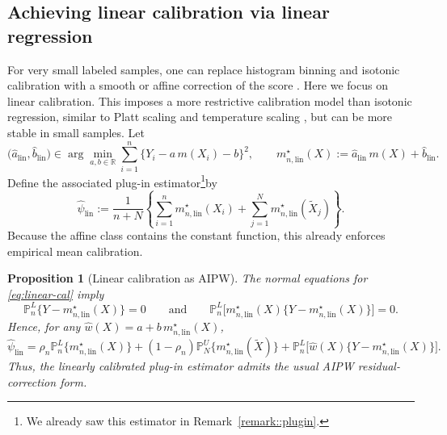 \documentclass{article}
\theoremstyle{plain}
\newtheorem{proposition}{Proposition}
\theoremstyle{definition}
\newcommand{\R}{\mathbb{R}}
\newcommand{\1}{\mathbbm{1}}
\newcommand{\mhat}{m}
\newcommand{\rhon}{\rho_n}
\newcommand{\Pl}{\mathbb{P}^{L}_n}
\newcommand{\Pu}{\mathbb{P}^{U}_N}
\begin{document}
\subsection{Achieving linear calibration via linear regression}
\label{sec:linear}
For very small labeled samples, one can replace histogram binning and isotonic calibration with a smooth or affine correction of the score \citep{jiang2011smooth,lucena2018spline}. Here we focus on linear calibration. This imposes a more restrictive calibration model than isotonic regression, similar to Platt scaling and temperature scaling \citep{platt1999probabilistic,guo2017calibration}, but can be more stable in small samples. Let
\begin{equation}
\label{eq:linear-cal}
\bigl(\hat a_{\mathrm{lin}},\hat b_{\mathrm{lin}}\bigr)\in\arg\min_{a,b\in\R}\sum_{i=1}^n \{Y_i-a\,\mhat(X_i)-b\}^2,
\qquad
m_{n,\mathrm{lin}}^\star(X):=\hat a_{\mathrm{lin}}\,\mhat(X)+\hat b_{\mathrm{lin}}.
\end{equation}
Define the associated plug-in estimator\footnote{We already saw this estimator in Remark~\ref{remark::plugin}.}by
\begin{equation}
\label{eq:linear-plugin}
\widehat{\psi}_{\mathrm{lin}}
:= \frac{1}{n+N}
\left\{
\sum_{i=1}^n m_{n,\mathrm{lin}}^\star(X_i)
+
\sum_{j=1}^N m_{n,\mathrm{lin}}^\star(\widetilde X_j)
\right\}.
\end{equation}
Because the affine class contains the constant function, this already enforces empirical mean calibration.  
 


\begin{proposition}[Linear calibration as AIPW]
\label{prop:linear}
The normal equations for \cref{eq:linear-cal} imply
\[
\Pl\{Y-m_{n,\mathrm{lin}}^\star(X)\}=0
\qquad\text{and}\qquad
\Pl\bigl[m_{n,\mathrm{lin}}^\star(X)\{Y-m_{n,\mathrm{lin}}^\star(X)\}\bigr]=0.
\]
Hence, for any \(\hat w(X)=a+b\,m_{n,\mathrm{lin}}^\star(X)\),
\begin{equation}
\label{eq:linear-ppi}
\widehat{\psi}_{\mathrm{lin}}
=
\rhon \Pl\{m_{n,\mathrm{lin}}^\star(X)\}
+(1-\rhon)\Pu\{m_{n,\mathrm{lin}}^\star(\widetilde X)\}
+
\Pl\bigl[\hat w(X)\{Y-m_{n,\mathrm{lin}}^\star(X)\}\bigr].
\end{equation}
Thus, the linearly calibrated plug-in estimator admits the usual AIPW residual-correction form.
\end{proposition}
\end{document}
